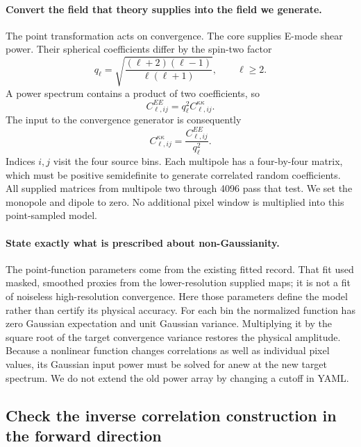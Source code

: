 \documentclass[11pt]{article}
\begin{document}
\paragraph{Convert the field that theory supplies into the field we generate.}
The point transformation acts on convergence. The core supplies E-mode
shear power. Their spherical coefficients differ by the spin-two factor
\begin{equation}
 q_\ell=\sqrt{\frac{(\ell+2)(\ell-1)}{\ell(\ell+1)}},\qquad \ell\geq2.
\end{equation}
A power spectrum contains a product of two coefficients, so
\begin{equation}
 C_{\ell,ij}^{EE}=q_\ell^2 C_{\ell,ij}^{\kappa\kappa}.
\end{equation}
The input to the convergence generator is consequently
\begin{equation}
 C_{\ell,ij}^{\kappa\kappa}=\frac{C_{\ell,ij}^{EE}}{q_\ell^2}.
\end{equation}
Indices $i,j$ visit the four source bins. Each multipole has a four-by-four
matrix, which must be positive semidefinite to generate correlated random
coefficients. All supplied matrices from multipole two through 4096 pass
that test. We set the monopole and dipole to zero. No additional pixel
window is multiplied into this point-sampled model.

\paragraph{State exactly what is prescribed about non-Gaussianity.}
The point-function parameters come from the existing fitted record. That
fit used masked, smoothed proxies from the lower-resolution supplied maps;
it is not a fit of noiseless high-resolution convergence. Here those
parameters define the model rather than certify its physical accuracy.
For each bin the normalized function has zero Gaussian expectation and
unit Gaussian variance. Multiplying it by the square root of the target
convergence variance restores the physical amplitude. Because a nonlinear
function changes correlations as well as individual pixel values, its
Gaussian input power must be solved for anew at the new target spectrum.
We do not extend the old power array by changing a cutoff in YAML.

\subsection{Check the inverse correlation construction in the forward direction}
\end{document}
